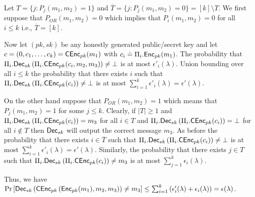 \begin{remindertheorem}{}
    \thmORCorrect
\end{remindertheorem}
\begin{proofof}{}
Let $T= \{j: P_j(m_1,m_2)=1\}$ and $\overline{T} = \{j: P_j(m_1,m_2)=0\} = [k] \setminus T$.  We first suppose that $P_{OR}(m_1,m_2)=0$ which implies that $P_i(m_1,m_2)=0$ for all $i \leq k$ i.e., $\overline{T} = [k]$. 

Now let $(pk,sk)$ be any honestly generated public/secret key and let $c = (0,c_1,\ldots,c_k) = {\mathsf{C}}{\mathsf{Enc}}_{pk}(m_1)$ with $c_i \doteq \Pi_i.{\mathsf{Enc}}_{pk}(m_1)$. The probability that $\Pi_i.{\mathsf{Dec}}_{sk}\left(\Pi_i.{\mathsf{C}}{\mathsf{Enc}}_{pk}(c_i,m_2,m_3)\right) \neq \bot$ is at most $\epsilon'_i(\lambda)$. Union bounding over all $i \leq k$ the probability that there exists $i$ such that $\Pi_i.{\mathsf{Dec}}_{sk}\left(\Pi_i.{\mathsf{C}}{\mathsf{Enc}}_{pk}(c_i)\right) \neq \bot$ is at most $\sum_{i=1}^k \epsilon'_i(\lambda) = \epsilon'(\lambda)$.

On the other hand suppose that $P_{OR}(m_1,m_2)=1$ which means that $P_j(m_1,m_2)=1$ for some $j\leq k$. Clearly, if $|T|\geq 1$ and $\Pi_i.{\mathsf{Dec}}_{sk}\left(\Pi_i.{\mathsf{C}}{\mathsf{Enc}}_{pk}(c_i)\right) = m_3$ for all $i \in T$ and $\Pi_i.{\mathsf{Dec}}_{sk}\left(\Pi_i.{\mathsf{C}}{\mathsf{Enc}}_{pk}(c_i)\right) = \bot$ for all $i \not \in T$ then ${\mathsf{Dec}}_{sk}$ will output the correct message $m_3$. As before the probability that there exists $i \in \overline{T}$ such that $\Pi_i.{\mathsf{Dec}}_{sk}\left(\Pi_i.{\mathsf{C}}{\mathsf{Enc}}_{pk}(c_i)\right) \neq \bot$ is at most $\sum_{i=1}^k \epsilon'_i(\lambda) = \epsilon'(\lambda)$. Similarly, the probability that there exists $j \in T$ such that $\Pi_i.{\mathsf{Dec}}_{sk}\left(\Pi_i.{\mathsf{C}}{\mathsf{Enc}}_{pk}(c_i)\right) \neq m_3$ is at most $\sum_{j=1}^k \epsilon_i(\lambda)$. 

Thus, we have $\Pr\left[{\mathsf{Dec}}_{sk}\left({\mathsf{C}}{\mathsf{Enc}}_{pk}\left( {\mathsf{Enc}}_{pk}(m_1) ,m_2,m_3 \right)\right) \neq m_3 \right] \leq \sum_{i=1}^k \left( \epsilon_i'(\lambda)+\epsilon_i(\lambda)\right) = \epsilon(\lambda)$.



\end{proofof}